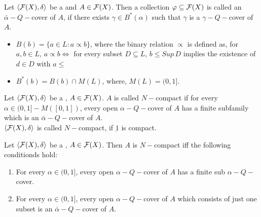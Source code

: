 \documentclass[../main-sheet.tex]{subfiles}
\begin{document}
\begin{defn}
    Let \(\langle \mathcal{F}(X), \delta \rangle \) be a \fts\s and \(A\in \mathcal{F}(X) \). Then a collection \(\varphi\subseteq \mathcal{F}(X)\) is called an \(\bar{\alpha}-Q-\)cover of \(A \), if there exists \(\gamma\in B^*(\alpha) \) such that \(\gamma\) is a \(\gamma-Q-\)cover of \(A \).
\end{defn}
\begin{itemize}
    \item \(B(b)=\{a\in L:a\propto b \}\), where the binary relation \(\propto\) is defined as, for \(a,b \in L \), \(a\propto b \Leftrightarrow\) for every subset \(D\subseteq L \), \(b\leq Sup\, D\) implies the existence of \(d\in D \) with \(a\leq\)
    \item \(B^*(b)=B(b)\cap M(L )\), where, \(M(L)=(0,1]\).
\end{itemize}
\begin{defn}
    Let \(\langle \mathcal{F}(X), \delta \rangle\) be a \fts, \(A\in\mathcal{F}(X) \). \(A \) is called \(N-\)compact if for every \(\alpha\in(0,1]-M([0,1])\), every open \(\alpha-Q-\)cover of \(A \) has a finite subfamily which is an \(\bar{\alpha}-Q-\)cover of \(A \).\\
    \(\langle \mathcal{F}(X), \delta \rangle \) is called \(N-\)compact, if \(\underbar{1}\) is compact.
\end{defn}
\begin{thm}
    Let \(\langle \mathcal{F}(X), \delta \rangle\) be a \fts, \(A\in\mathcal{F}(X)\). Then \(A \) is \(N-\)compact iff the following conditionds hold:
    \begin{enumerate}[label=(\alph*)]
        \item For every \(\alpha\in(0,1]\), every open \(\alpha-Q-\)cover of \(A \) has a finite sub \(\alpha-Q-\)cover.
        \item For every \(\alpha\in(0,1]\), every open \(\alpha-Q-\)cover of \(A \) which consists of just one subset is an \(\bar{\alpha}-Q-\)cover of \(A \).
    \end{enumerate}
\end{thm}
\end{document}
